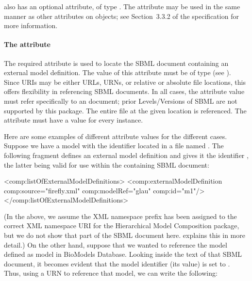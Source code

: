 \ExternalModelDefinition also has an optional  attribute, of
type .  The  attribute may be used
in the same manner as other  attributes on \sbmlthreecore
objects; see Section~3.3.2 of the \sbmlthreecore
specification for more information.


\paragraph{The \fixttspace{} attribute}

The required attribute  is used to locate the SBML
document containing an external model definition.  The value of this
attribute must be of type  (see ).
Since URIs may be either URLs, URNs, or relative or absolute file
locations, this offers flexibility in referencing SBML documents.  In
all cases, the  attribute value must refer specifically to
an \sbmlthree document; prior Levels/Versions of SBML are
not supported by this package.  The entire file at the given location is
referenced.  The  attribute must have a value for every
\ExternalModelDefinition instance.

Here are some examples of different  attribute values for
the different cases.  Suppose we have a model with the identifier
 located in a file named .  The following
fragment defines an external model definition and gives it the
identifier , the latter being valid for use within the
containing SBML document:

\begin{example}
<comp:listOfExternalModelDefinitions>
    <comp:externalModelDefinition comp:source="firefly.xml" comp:modelRef="glau" comp:id="m1"/>
</comp:listOfExternalModelDefinitions>
\end{example}

(In the above, we assume the XML namespace prefix  has been
assigned to the correct XML namespace URI for the Hierarchical Model
Composition package, but we do not show that part of the SBML document
here.   explains this in more detail.)  On the other
hand, suppose that we wanted to reference the model defined as model
 in BioModels Database.  Looking inside the text of
that SBML document, it becomes evident that the model identifier (its
 value) is set to .  Thus, using a URN to reference
that model, we can write the following:

